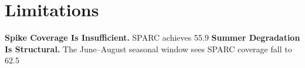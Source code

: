 {\section{Limitations}
\textbf{Spike Coverage Is Insufficient.} SPARC achieves 55.9%
\textbf{Summer Degradation Is Structural.} The June--August seasonal window sees SPARC coverage fall to 62.5%
}
